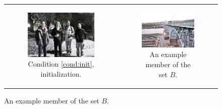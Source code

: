 \documentclass[twocolumn]{article}
\theoremstyle{plain}  %
\theoremstyle{definition}  %
\theoremstyle{remark}  %
\begin{document}
\begin{figure}[b]
	\begin{tabular}{cc}
	\begin{subfigure}[b]{0.45\textwidth}
	\centering
	\includegraphics[width=\textwidth]{initialization.png}
	\caption{Condition \ref{cond:init}, initialization.}
	\end{subfigure}
	&
	\begin{subfigure}[b]{0.45\textwidth}
	\centering
	\includegraphics[width=\textwidth]{mckees.png}
	\caption{An example member of the set $B$.}
	\end{subfigure}
	\\


\end{tabular}
\end{figure}
\end{document}
